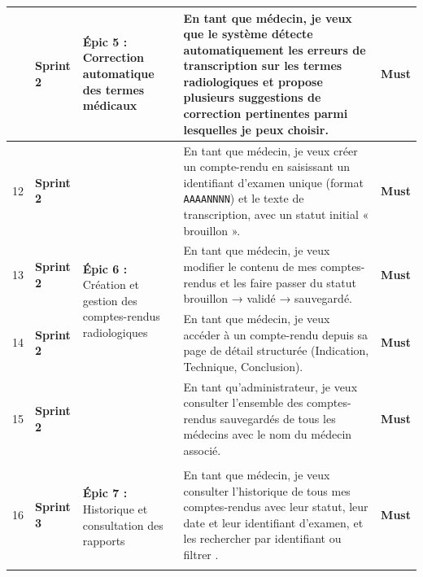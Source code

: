 \documentclass[12pt,a4paper]{report}
\newcommand{\must}{\textcolor{must}{\textbf{Must}}}
\newcommand{\sprinttwo}[1]{\cellcolor{sprint2bg}\textcolor{sprint2txt}{\textbf{#1}}}
\newcommand{\sprintthree}[1]{\cellcolor{sprint3bg}\textcolor{sprint3txt}{\textbf{#1}}}
\begin{document}
\begin{longtable}{
  |>{\centering\arraybackslash}p{0.7cm}
  |>{\centering\arraybackslash}p{2.2cm}
  |p{3.8cm}
  |p{6.8cm}
  |>{\centering\arraybackslash}p{1.4cm}|
}
10 & \sprinttwo{Sprint 2}
   & \multirow{2}{3.8cm}{\textbf{Épic 5 :} Correction automatique des termes médicaux}
   & En tant que médecin, je veux que le système détecte automatiquement les erreurs de transcription sur les termes radiologiques et propose plusieurs suggestions de correction pertinentes parmi lesquelles je peux choisir.
   & \must \\ \cline{1-2}\cline{4-5}

12 & \sprinttwo{Sprint 2}
   & \multirow{4}{3.8cm}{\textbf{Épic 6 :} Création et gestion des comptes-rendus radiologiques}
   & En tant que médecin, je veux créer un compte-rendu en saisissant un identifiant d'examen unique (format \texttt{AAAANNNN}) et le texte de transcription, avec un statut initial « brouillon ».
   & \must \\ \cline{1-2}\cline{4-5}

13 & \sprinttwo{Sprint 2} &
   & En tant que médecin, je veux modifier le contenu de mes comptes-rendus et les faire passer du statut brouillon → validé → sauvegardé.
   & \must \\ \cline{1-2}\cline{4-5}

14 & \sprinttwo{Sprint 2} &
   & En tant que médecin, je veux accéder à un compte-rendu depuis sa page de détail structurée (Indication, Technique, Conclusion).
   & \must \\ \cline{1-2}\cline{4-5}

15 & \sprinttwo{Sprint 2} &
   & En tant qu'administrateur, je veux consulter l'ensemble des comptes-rendus sauvegardés de tous les médecins avec le nom du médecin associé.
   & \must \\ \hline


\multicolumn{5}{|c|}{\cellcolor{sprint3bg}\textcolor{sprint3txt}{\Large\bfseries Sprint 3 — Historique, Réclamations \& Export CSV}} \\ \hline

16 & \sprintthree{Sprint 3}
   & \multirow{2}{3.8cm}{\textbf{Épic 7 :} Historique et consultation des rapports}
   & En tant que médecin, je veux consulter l'historique de tous mes comptes-rendus avec leur statut, leur date et leur identifiant d'examen, et les rechercher par identifiant ou filtrer .
   & \must \\ \cline{1-2}\cline{4-5}


\end{longtable}
\end{document}
